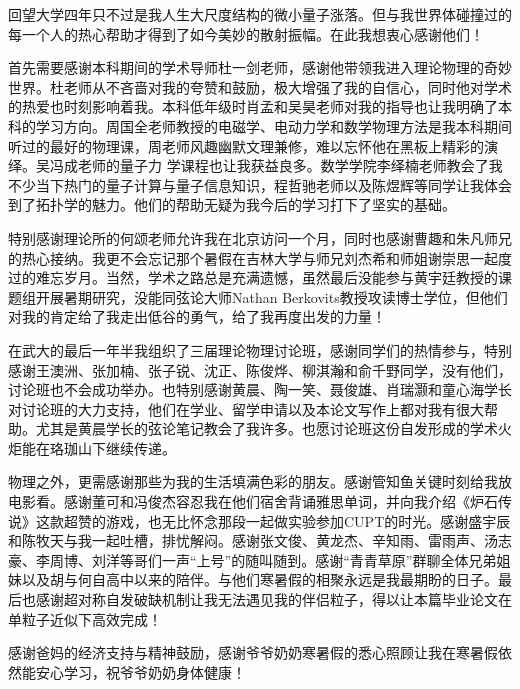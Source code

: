 \begin{acknowledgements}
	回望大学四年只不过是我人生大尺度结构的微小量子涨落。但与我世界体碰撞过的每一个人的热心帮助才得到了如今美妙的散射振幅。在此我想衷心感谢他们！
	
	首先需要感谢本科期间的学术导师杜一剑老师，感谢他带领我进入理论物理的奇妙世界。杜老师从不吝啬对我的夸赞和鼓励，极大增强了我的自信心，同时他对学术的热爱也时刻影响着我。本科低年级时肖孟和吴昊老师对我的指导也让我明确了本科的学习方向。周国全老师教授的电磁学、电动力学和数学物理方法是我本科期间听过的最好的物理课，周老师风趣幽默文理兼修，难以忘怀他在黑板上精彩的演绎。吴冯成老师的量子力 学课程也让我获益良多。数学学院李绎楠老师教会了我不少当下热门的量子计算与量子信息知识，程哲驰老师以及陈煜辉等同学让我体会到了拓扑学的魅力。他们的帮助无疑为我今后的学习打下了坚实的基础。
	
	特别感谢理论所的何颂老师允许我在北京访问一个月，同时也感谢曹趣和朱凡师兄的热心接纳。我更不会忘记那个暑假在吉林大学与师兄刘杰希和师姐谢崇思一起度过的难忘岁月。当然，学术之路总是充满遗憾，虽然最后没能参与黄宇廷教授的课题组开展暑期研究，没能同弦论大师Nathan Berkovits教授攻读博士学位，但他们对我的肯定给了我走出低谷的勇气，给了我再度出发的力量！
	
	在武大的最后一年半我组织了三届理论物理讨论班，感谢同学们的热情参与，特别感谢王澳洲、张加楠、张子锐、沈正、陈俊烨、柳淇瀚和俞千野同学，没有他们，讨论班也不会成功举办。也特别感谢黄晨、陶一笑、聂俊雄、肖瑞灏和童心海学长对讨论班的大力支持，他们在学业、留学申请以及本论文写作上都对我有很大帮助。尤其是黄晨学长的弦论笔记教会了我许多。也愿讨论班这份自发形成的学术火炬能在珞珈山下继续传递。
	
	物理之外，更需感谢那些为我的生活填满色彩的朋友。感谢管知鱼关键时刻给我放电影看。感谢董可和冯俊杰容忍我在他们宿舍背诵雅思单词，并向我介绍《炉石传说》这款超赞的游戏，也无比怀念那段一起做实验参加CUPT的时光。感谢盛宇辰和陈牧天与我一起吐槽，排忧解闷。感谢张文俊、黄龙杰、辛知雨、雷雨声、汤志豪、李周博、刘洋等哥们一声“上号”的随叫随到。感谢“青青草原”群聊全体兄弟姐妹以及胡与何自高中以来的陪伴。与他们寒暑假的相聚永远是我最期盼的日子。最后也感谢超对称自发破缺机制让我无法遇见我的伴侣粒子，得以让本篇毕业论文在单粒子近似下高效完成！
	
	感谢爸妈的经济支持与精神鼓励，感谢爷爷奶奶寒暑假的悉心照顾让我在寒暑假依然能安心学习，祝爷爷奶奶身体健康！
\end{acknowledgements}
